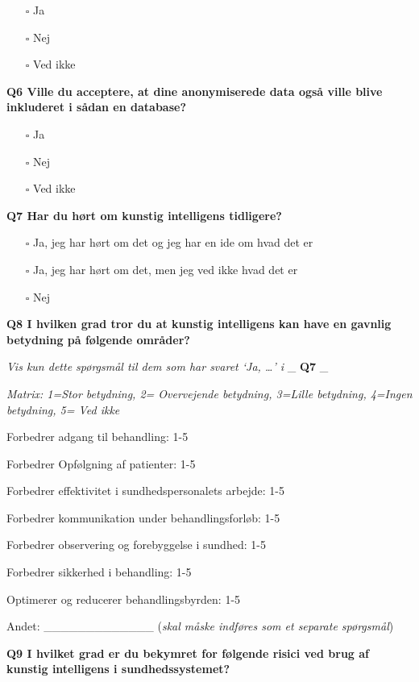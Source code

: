 \documentclass[
]{article}
\providecommand{\tightlist}{%
  \setlength{\itemsep}{0pt}\setlength{\parskip}{0pt}}
\begin{document}
\begin{itemize}
\tightlist
\item[$\square$]
  Ja
\item[$\square$]
  Nej
\item[$\square$]
  Ved ikke
\end{itemize}

\textbf{Q6 Ville du acceptere, at dine anonymiserede data også ville
blive inkluderet i sådan en database?}

\begin{itemize}
\tightlist
\item[$\square$]
  Ja
\item[$\square$]
  Nej
\item[$\square$]
  Ved ikke
\end{itemize}

\textbf{Q7 Har du hørt om kunstig intelligens tidligere?}

\begin{itemize}
\tightlist
\item[$\square$]
  Ja, jeg har hørt om det og jeg har en ide om hvad det er
\item[$\square$]
  Ja, jeg har hørt om det, men jeg ved ikke hvad det er
\item[$\square$]
  Nej
\end{itemize}

\textbf{Q8 I hvilken grad tror du at kunstig intelligens kan have en
gavnlig betydning på følgende områder?}

\emph{Vis kun dette spørgsmål til dem som har svaret `Ja, \ldots{}' i}
\_ \textbf{Q7} \_

\emph{Matrix: 1=Stor betydning, 2= Overvejende betydning, 3=Lille
betydning, 4=Ingen betydning, 5= Ved ikke}

Forbedrer adgang til behandling: 1-5

Forbedrer Opfølgning af patienter: 1-5

Forbedrer effektivitet i sundhedspersonalets arbejde: 1-5

Forbedrer kommunikation under behandlingsforløb: 1-5

Forbedrer observering og forebyggelse i sundhed: 1-5

Forbedrer sikkerhed i behandling: 1-5

Optimerer og reducerer behandlingsbyrden: 1-5

Andet: \_\_\_\_\_\_\_\_\_\_\_\_\_ (\emph{skal måske indføres som et
separate spørgsmål})

\textbf{Q9 I hvilket grad er du bekymret for følgende risici ved brug af
kunstig intelligens i sundhedssystemet?}
\end{document}
